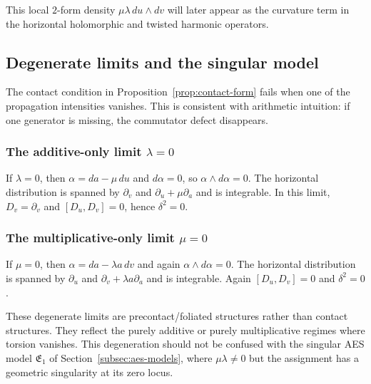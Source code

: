 This local $2$-form density $\mu\lambda\,du\wedge dv$ will later appear as the curvature term in the horizontal holomorphic and twisted harmonic operators.

\subsection{Degenerate limits and the singular model}\label{subsec:contact-degenerate}

The contact condition in Proposition~\ref{prop:contact-form} fails when one of the propagation intensities vanishes. This is consistent with arithmetic intuition: if one generator is missing, the commutator defect disappears.

\subsubsection*{The additive-only limit \texorpdfstring{$\lambda=0$}{lambda=0}}
If $\lambda=0$, then $\alpha=da-\mu\,du$ and $d\alpha=0$, so $\alpha\wedge d\alpha=0$. The horizontal distribution is spanned by $\partial_v$ and $\partial_u+\mu\partial_a$ and is integrable. In this limit, $D_v=\partial_v$ and $[D_u,D_v]=0$, hence $\delta^2=0$.

\subsubsection*{The multiplicative-only limit \texorpdfstring{$\mu=0$}{mu=0}}
If $\mu=0$, then $\alpha=da-\lambda a\,dv$ and again $\alpha\wedge d\alpha=0$. The horizontal distribution is spanned by $\partial_u$ and $\partial_v+\lambda a\partial_a$ and is integrable. Again $[D_u,D_v]=0$ and $\delta^2=0$.

These degenerate limits are precontact/foliated structures rather than contact structures. They reflect the purely additive or purely multiplicative regimes where torsion vanishes. This degeneration should not be confused with the singular AES model $\mathfrak{E}_1$ of Section~\ref{subsec:aes-models}, where $\mu\lambda\neq 0$ but the assignment has a geometric singularity at its zero locus.
